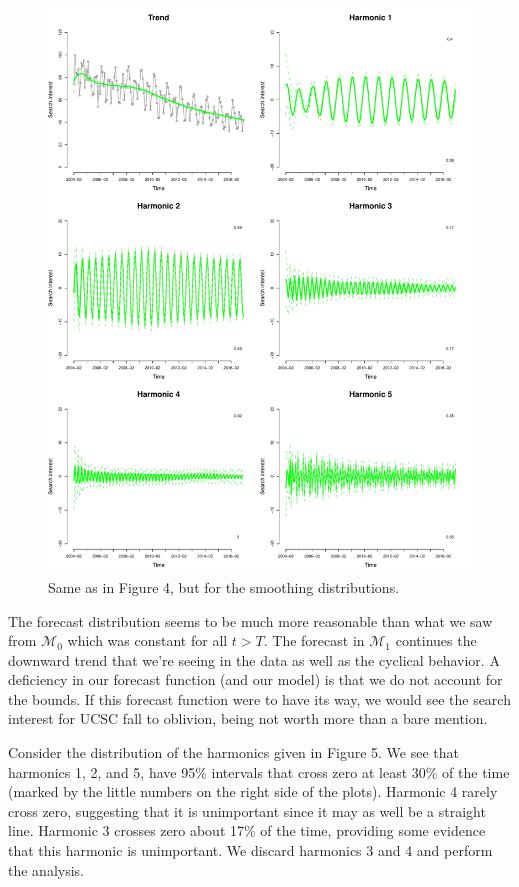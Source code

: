\documentclass[12pt]{article}
\begin{document}
\begin{figure}[H]
\begin{center}
\includegraphics[scale=0.40]{figs/m1_smooth_components.pdf}
\end{center}
\caption{Same as in Figure 4, but for the smoothing distributions.}
\end{figure}

\newpage
\noindent The forecast distribution seems to be much more reasonable than what we saw from $\mathcal{M}_0$ which was constant for all $t>T$. The forecast in $\mathcal{M}_1$ continues the downward trend that we're seeing in the data as well as the cyclical behavior. A deficiency in our forecast function (and our model) is that we do not account for the bounds. If this forecast function were to have its way, we would see the search interest for UCSC fall to oblivion, being not worth more than a bare mention.
\bigskip

\noindent Consider the distribution of the harmonics given in Figure 5. We see that harmonics 1, 2, and 5, have 95\% intervals that cross zero at least 30\% of the time (marked by the little numbers on the right side of the plots). Harmonic 4 rarely cross zero, suggesting that it is unimportant since it may as well be a straight line. Harmonic 3 crosses zero about 17\% of the time, providing some evidence that this harmonic is unimportant. We discard harmonics 3 and 4 and perform the analysis.
\bigskip
\end{document}
